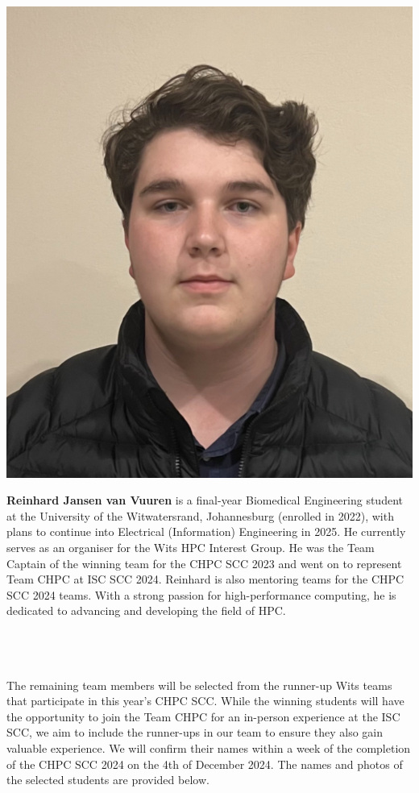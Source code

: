 \documentclass[10pt, onecolumn]{IEEEtran}
\begin{document}
\begin{minipage}{0.2\textwidth}
  \includegraphics[width=\textwidth]{reinhard_bio.png}
\end{minipage}
\hspace{0.02\textwidth} %
\begin{minipage}{0.65\textwidth}
\textbf{Reinhard Jansen van Vuuren} is a final-year Biomedical Engineering student at the University of the Witwatersrand, Johannesburg (enrolled in 2022), with plans to continue into Electrical (Information) Engineering in 2025. He currently serves as an organiser for the Wits HPC Interest Group. He was the Team Captain of the winning team for the CHPC SCC 2023 and went on to represent Team CHPC at ISC SCC 2024. Reinhard is also mentoring teams for the CHPC SCC 2024 teams. With a strong passion for high-performance computing, he is dedicated to advancing and developing the field of HPC.
\end{minipage}
\\\\\\
\noindent
The remaining team members will be selected from the runner-up Wits teams that participate in this year's CHPC SCC. While the winning students will have the opportunity to join the Team CHPC for an in-person experience at the ISC SCC, we aim to include the runner-ups in our team to ensure they also gain valuable experience. We will confirm their names within a week of the completion of the CHPC SCC 2024 on the 4th of December 2024. The names and photos of the selected students are provided below.
\end{document}
